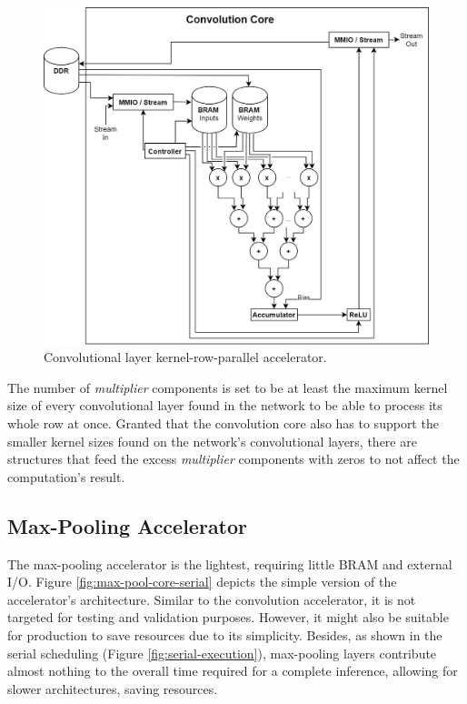 \begin{figure} [H]
	\centering
	\includegraphics[width=\textwidth]{Images/Platform/Conv_core_row_parallel.png}
	\decoRule
	\caption[Convolutional layer kernel-row-parallel accelerator]{Convolutional layer kernel-row-parallel accelerator.}
	\label{fig:conv-core-row-parallel}
\end{figure}

The number of \emph{multiplier} components is set to be at least the maximum kernel size of every convolutional layer found in the network to be able to process its whole row at once. Granted that the convolution core also has to support the smaller kernel sizes found on the network's convolutional layers, there are structures that feed the excess \emph{multiplier} components with zeros to not affect the computation's result.

\subsection{Max-Pooling Accelerator}
The max-pooling accelerator is the lightest, requiring little BRAM and external I/O. Figure \ref{fig:max-pool-core-serial} depicts the simple version of the accelerator's architecture. Similar to the convolution accelerator, it is not targeted for testing and validation purposes. However, it might also be suitable for production to save resources due to its simplicity. Besides, as shown in the serial scheduling (Figure \ref{fig:serial-execution}), max-pooling layers contribute almost nothing to the overall time required for a complete inference, allowing for slower architectures, saving resources.

